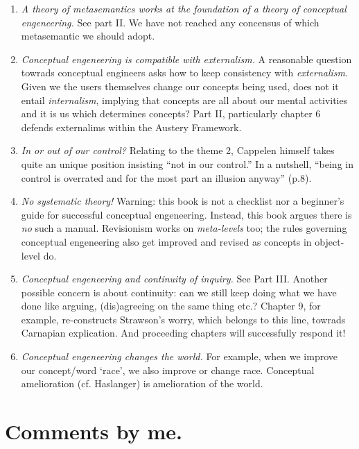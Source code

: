 \documentclass[
10pt, %
a4paper, %
twocolumn, %
landscape %
]{article}
\begin{document}
\begin{enumerate}
  \item \emph{A theory of metasemantics works at the foundation of a theory of conceptual engeneering.}
See part II. We have not reached any concensus of which metasemantic we should adopt.

  \item \emph{Conceptual engeneering is compatible with externalism.}
  A reasonable question towrads conceptual engineers asks how to keep consistency with \emph{externalism}.
  Given we the users themselves change our concepts being used, does not it entail \emph{internalism}, implying that concepts are all about our mental activities and it is us which determines concepts?
Part II, particularly chapter 6 defends externalims within the Austery Framework.

  \item \emph{In or out of our control?}
  Relating to the theme 2, Cappelen himself takes quite an unique position insisting ``not in our control.''
In a nutshell, ``being in control is overrated and for the most part an illusion anyway'' (p.8).

  \item \emph{No systematic theory!}
  Warning: this book is not a checklist nor a beginner's guide for successful conceptual engeneering. Instead, this book argues there is \emph{no} such a manual.
Revisionism works on \emph{meta-levels} too; the rules governing conceptual engeneering also get improved and revised as concepts in object-level do.

  \item \emph{Conceptual engeneering and continuity of inquiry.}
  See Part III.
Another possible concern is about continuity: can we still keep doing what we have done like arguing, (dis)agreeing on the same thing etc.?
Chapter 9, for example, re-constructs Strawson's worry, which belongs to this line, towrads Carnapian explication. And proceeding chapters will successfully respond it!

  \item \emph{Conceptual engeneering changes the world.}
  For example, when we improve our concept/word `race', we also improve or change race.
Conceptual amelioration (cf. Haslanger) is amelioration of the world.

\end{enumerate}

\section*{Comments by me.}

\renewcommand{\refname}{Reference} %


\end{document}
